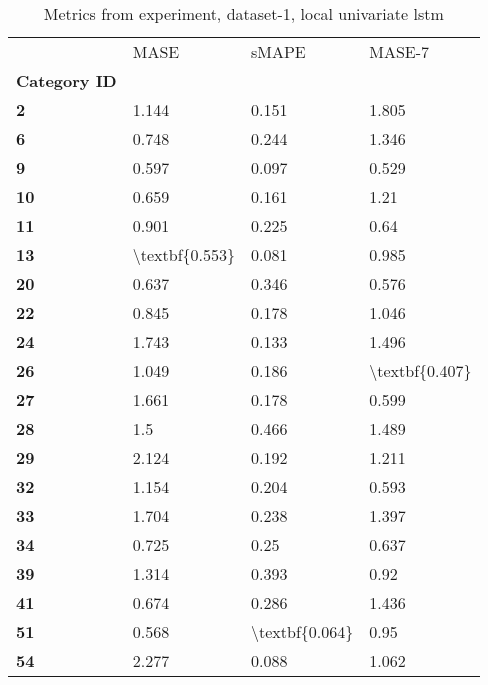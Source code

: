 \begin{table}[h]
\centering
\caption{Metrics from experiment, dataset-1, local univariate lstm}
\label{table:local-univariate-lstm-dataset-1}
\begin{tabular}{llll}
\toprule
{} &            MASE &           sMAPE &          MASE-7 \\
\textbf{Category ID} &                 &                 &                 \\
\midrule
\textbf{2          } &           1.144 &           0.151 &           1.805 \\
\textbf{6          } &           0.748 &           0.244 &           1.346 \\
\textbf{9          } &           0.597 &           0.097 &           0.529 \\
\textbf{10         } &           0.659 &           0.161 &            1.21 \\
\textbf{11         } &           0.901 &           0.225 &            0.64 \\
\textbf{13         } &  \textbackslash textbf\{0.553\} &           0.081 &           0.985 \\
\textbf{20         } &           0.637 &           0.346 &           0.576 \\
\textbf{22         } &           0.845 &           0.178 &           1.046 \\
\textbf{24         } &           1.743 &           0.133 &           1.496 \\
\textbf{26         } &           1.049 &           0.186 &  \textbackslash textbf\{0.407\} \\
\textbf{27         } &           1.661 &           0.178 &           0.599 \\
\textbf{28         } &             1.5 &           0.466 &           1.489 \\
\textbf{29         } &           2.124 &           0.192 &           1.211 \\
\textbf{32         } &           1.154 &           0.204 &           0.593 \\
\textbf{33         } &           1.704 &           0.238 &           1.397 \\
\textbf{34         } &           0.725 &            0.25 &           0.637 \\
\textbf{39         } &           1.314 &           0.393 &            0.92 \\
\textbf{41         } &           0.674 &           0.286 &           1.436 \\
\textbf{51         } &           0.568 &  \textbackslash textbf\{0.064\} &            0.95 \\
\textbf{54         } &           2.277 &           0.088 &           1.062 \\
\bottomrule
\end{tabular}
\end{table}
